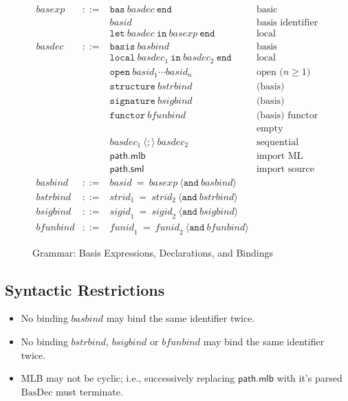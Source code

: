 \documentclass[draft]{article}
\renewcommand{\mit}[1]{\mathit{#1}}
\newcommand{\mrm}[1]{\mathrm{#1}}
\newcommand{\mtt}[1]{\mathtt{#1}}
\newcommand{\msf}[1]{\mathsf{#1}}
\begin{document}
\begin{figure}[h]
\begin{displaymath}
\begin{array}{rcll}
\mit{basexp} & ::= & 
\mtt{bas}~ \mit{basdec} ~\mtt{end} 
& \mbox{basic} \\&& 
\mit{basid} 
& \mbox{basis identifier} \\&&
\mtt{let}~ \mit{basdec} ~\mtt{in}~ \mit{basexp} ~\mtt{end} 
& \mbox{local declaration} \\

\mit{basdec} & ::= & 
\mtt{basis}~ \mit{basbind}
& \mbox{basis} \\&&
\mtt{local}~ \mit{basdec}_1 ~\mtt{in}~ \mit{basdec}_2 ~\mtt{end} 
& \mbox{local} \\&&
\mtt{open}~ \mit{basid}_1 \cdots \mit{basid}_n 
& \mbox{open ($n \geq 1$)} \\&&
\mtt{structure}~ \mit{bstrbind}
& \mbox{(basis) structure binding} \\&&
\mtt{signature}~ \mit{bsigbind}
& \mbox{(basis) signature binding} \\&&
\mtt{functor}~ \mit{bfunbind}
& \mbox{(basis) functor binding} \\&&
\quad
& \mbox{empty} \\&&
\mit{basdec}_1~\langle\mtt{;}\rangle~\mit{basdec}_2 
& \mbox{sequential} \\&&
\msf{path.mlb} &
\mbox{import ML basis} \\&&
\msf{path.sml} 
& \mbox{import source} \\

\mit{basbind} & ::= &  
\mit{basid} ~\mtt{=}~ \mit{basexp} ~\langle\mtt{and}~ \mit{basbind}\rangle \\
\mit{bstrbind} & ::= &  
\mit{strid}_1 ~\mtt{=}~ \mit{strid}_2 ~\langle\mtt{and}~ \mit{bstrbind}\rangle \\
\mit{bsigbind} & ::= &  
\mit{sigid}_1 ~\mtt{=}~ \mit{sigid}_2 ~\langle\mtt{and}~ \mit{bsigbind}\rangle \\
\mit{bfunbind} & ::= &  
\mit{funid}_1 ~\mtt{=}~ \mit{funid}_2 ~\langle\mtt{and}~ \mit{bfunbind}\rangle
\end{array}
\end{displaymath}
\caption{Grammar: Basis Expressions, Declarations, and Bindings}\label{fig:mlb:S:GrammaticalRules}
\end{figure}
%
\subsection{Syntactic Restrictions}
\begin{itemize}
\item No binding $\mit{basbind}$ may bind the same identifier twice.
\item No binding $\mit{bstrbind}$, $\mit{bsigbind}$ or $\mit{bfunbind}$ may bind the same identifier twice.
\item MLB may not be cyclic; i.e., successively replacing
  $\msf{path.mlb}$ with it's parsed $\mrm{BasDec}$ must terminate.
\end{itemize}
%
\end{document}
